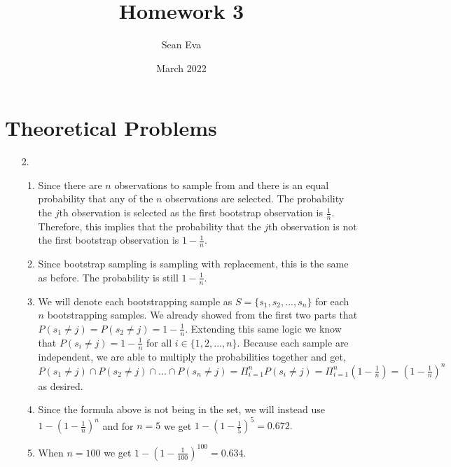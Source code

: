 \documentclass{article}
\title{Homework 3}
\author{Sean Eva}
\date{March 2022}
\begin{document}
\maketitle

\section{Theoretical Problems}
\begin{enumerate}
    \item [2. ]
    
    \begin{enumerate}
        \item 
        
        Since there are $n$ observations to sample from and there is an equal probability that any of the $n$ observations are selected. The probability the $j$th observation is selected as the first bootstrap observation is $\frac{1}{n}.$ Therefore, this implies that the probability that the $j$th observation is not the first bootstrap observation is $1-\frac{1}{n}.$
        
        \item
        
        Since bootstrap sampling is sampling with replacement, this is the same as before. The probability is still $1-\frac{1}{n}.$
        
        \item
        
        We will denote each bootstrapping sample as $S = \{s_1, s_2, ..., s_n\}$ for each $n$ bootstrapping samples. We already showed from the first two parts that $P(s_1\neq j) = P(s_2\neq j) = 1-\frac{1}{n}.$ Extending this same logic we know that $P(s_i \neq j) = 1-\frac{1}{n}$ for all $i \in \{1, 2, ..., n\}.$ Because each sample are independent, we are able to multiply the probabilities together and get, $P(s_1\neq j)\cap P(s_2\neq j) \cap ... \cap P(s_n\neq j) = \Pi_{i=1}^nP(s_i\neq j) = \Pi_{i=1}^n(1-\frac{1}{n}) = (1-\frac{1}{n})^n$ as desired.
        
        \item
        
        Since the formula above is not being in the set, we will instead use $1-(1-\frac{1}{n})^n$ and for $n=5$ we get $1-(1-\frac{1}{5})^5 = 0.672.$
        
        \item
        
        When $n=100$ we get $1-(1-\frac{1}{100})^{100} = 0.634.$
        

\end{enumerate}
\end{enumerate}
\end{document}
